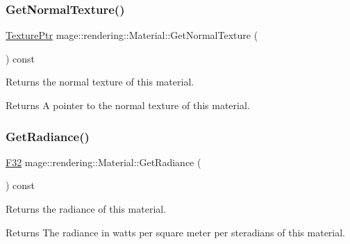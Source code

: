 \subsubsection{\texorpdfstring{Get\+Normal\+Texture()}{GetNormalTexture()}}
{\footnotesize\ttfamily \mbox{\hyperlink{namespacemage_1_1rendering_a6f3ae54f825328465b0cdde0f0de4a36}{Texture\+Ptr}} mage\+::rendering\+::\+Material\+::\+Get\+Normal\+Texture (\begin{DoxyParamCaption}{ }\end{DoxyParamCaption}) const\hspace{0.3cm}{\ttfamily [noexcept]}}

Returns the normal texture of this material.

\begin{DoxyReturn}{Returns}
A pointer to the normal texture of this material. 
\end{DoxyReturn}
\mbox{\label{classmage_1_1rendering_1_1_material_a5bfbc1bc67731126af7cf33b286bb07b}} 
\subsubsection{\texorpdfstring{Get\+Radiance()}{GetRadiance()}}
{\footnotesize\ttfamily \mbox{\hyperlink{namespacemage_aa97e833b45f06d60a0a9c4fc22ae02c0}{F32}} mage\+::rendering\+::\+Material\+::\+Get\+Radiance (\begin{DoxyParamCaption}{ }\end{DoxyParamCaption}) const\hspace{0.3cm}{\ttfamily [noexcept]}}

Returns the radiance of this material.

\begin{DoxyReturn}{Returns}
The radiance in watts per square meter per steradians of this material. 
\end{DoxyReturn}
\mbox{\label{classmage_1_1rendering_1_1_material_af8a3171b34409593673f1279e3f9ba29}} 
